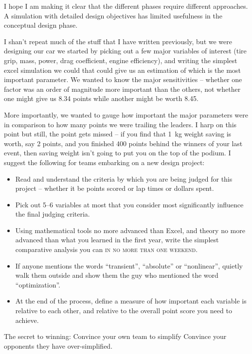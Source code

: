 \documentclass[10pt, a4paper, article, oneside, twocolumn, final]{memoir}
\begin{document}
I hope I am making it clear that the different phases require different approaches. A simulation with detailed design objectives has limited usefulness in the conceptual design phase. 

I shan’t repeat much of the stuff that I have written previously, but we were designing our car we started by picking out a few major variables of interest (tire grip, mass, power, drag coefficient, engine efficiency), and writing the simplest excel simulation we could that could give us an estimation of which is the most important parameter. We wanted to know the major sensitivities -- whether one factor was an order of magnitude more important than the others, not whether one might give us \num{8.34} points while another might be worth \num{8.45}. 

More importantly, we wanted to gauge how important the major parameters were in comparison to how many points we were trailing the leaders. I harp on this point but still, the point gets missed -- if you find that \SI{1}{\kilogram} weight saving is worth, say \num{2} points, and you finished \num{400} points behind the winners of your last event, then saving weight isn’t going to put you on the top of the podium. 
I suggest the following for teams embarking on a new design project: 

\begin{itemize}
    \item Read and understand the criteria by which you are being judged for this project -- whether it be points scored or lap times or dollars spent.
    \item Pick out \numrange{5}{6} variables at most that you consider most significantly influence the final judging criteria.
    \item Using mathematical tools no more advanced than Excel, and theory no more advanced than what you learned in the first year, write the simplest comparative analysis you can \textsc{in no more than one weekend}. 
    \item If anyone mentions the words “transient”, “absolute” or “nonlinear”, quietly walk them outside and show them the guy who mentioned the word “optimization”. 
    \item At the end of the process, define a measure of how important each variable is relative to each other, and relative to the overall point score you need to achieve. 
\end{itemize}

The secret to winning: Convince your own team to simplify Convince your opponents they have over-simplified.
\end{document}
